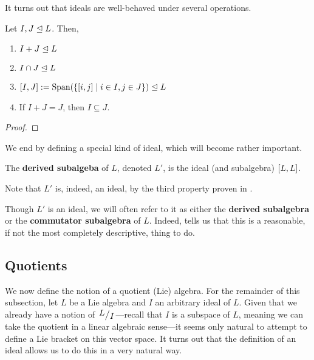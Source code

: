 It turns out that ideals are well-behaved under several operations.

\begin{boxproposition}\label{Ch1:Prop:IdealBhv}
    Let $I, J \trianglelefteq L$. Then,
    \begin{enumerate}[label = \normalfont\arabic*., noitemsep]
        \item $I + J \trianglelefteq L$
        \item $I \cap J \trianglelefteq L$
        \item $\left[ I, J \right] := \operatorname{Span}\!\left( \left\{ \left[ i, j \right] \; \middle\vert \; i \in I, j \in J \right\} \right) \trianglelefteq L$
        \item If $I + J = J$, then $I \subseteq J$.
    \end{enumerate}
\end{boxproposition}
\begin{proof}
    \sorry
\end{proof}

We end by defining a special kind of ideal, which will become rather important.

\begin{boxdefinition}\label{Ch1:Def:DerivedSubalg}
    The \textbf{derived subalgeba} of $L$, denoted $L'$, is the ideal (and subalgebra) $\left[ L, L \right]$.
\end{boxdefinition}

Note that $L'$ is, indeed, an ideal, by the third property proven in .

\begin{boxconvention}
    Though $L'$ is an ideal, we will often refer to it as either the \textbf{derived subalgebra} or the \textbf{commutator subalgebra} of $L$. Indeed,  tells us that this is a reasonable, if not the most completely descriptive, thing to do.
\end{boxconvention}

\subsection{Quotients}

We now define the notion of a quotient (Lie) algebra. For the remainder of this subsection, let $L$ be a Lie algebra and $I$ an arbitrary ideal of $L$. Given that we already have a notion of $\quotient{L}{I}$---recall that $I$ is a subspace of $L$, meaning we can take the quotient in a linear algebraic sense---it seems only natural to attempt to define a Lie bracket on this vector space. It turns out that the definition of an ideal allows us to do this in a very natural way.

